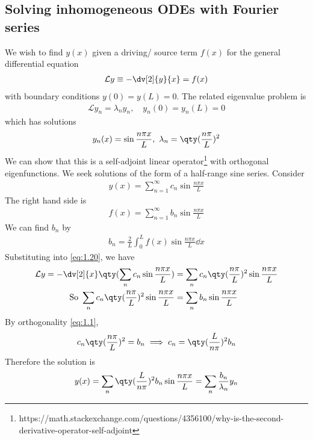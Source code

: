 \subsection{Solving inhomogeneous ODEs with Fourier series} \label{sec:1.6}
We wish to find $y(x)$ given a driving/ source term $f(x)$ for the general differential equation
\begin{align} \label{eq:1.20}
    \mathcal L y \equiv -\dv[2]{y}{x} = f(x)
\end{align}
with boundary conditions $y(0) = y(L) = 0$.
The related eigenvalue problem is
\begin{align*}
    \mathcal L y_n = \lambda_n y_n,\quad y_n(0) = y_n(L) = 0
\end{align*}
which has solutions
\begin{align} \label{eq:1.21}
    y_n(x) = \sin \frac{n \pi x}{L},\ \lambda_n = \qty(\frac{n\pi}{L})^2
\end{align}
We can show that this is a self-adjoint linear operator\footnote{https://math.stackexchange.com/questions/4356100/why-is-the-second-derivative-operator-self-adjoint} with orthogonal eigenfunctions.
We seek solutions of the form of a half-range sine series.
Consider
\begin{align*}
    y(x) = \sum_{n=1}^\infty c_n \sin\frac{n \pi x}{L}
\end{align*}
The right hand side is
\begin{align*}
    f(x) = \sum_{n=1}^\infty b_n \sin \frac{n \pi x}{L}
\end{align*}
We can find $b_n$ by
\begin{align*}
    b_n = \frac{2}{L} \int_0^L f(x) \sin \frac{n \pi x}{L} \dd{x}
\end{align*}
Substituting into \cref{eq:1.20}, we have
\begin{align*}
    \mathcal L y = -\dv[2]{x} \qty(\sum_n c_n \sin \frac{n \pi x}{L}) &= \sum_n c_n \qty(\frac{n\pi}{L})^2 \sin \frac{n \pi x}{L} \\
    \text{So } \sum_n c_n \qty(\frac{n\pi}{L})^2 \sin \frac{n \pi x}{L} &= \sum_n b_n \sin \frac{n \pi x}{L}
\end{align*}
By orthogonality \cref{eq:1.1},
\begin{align*}
    c_n \qty(\frac{n \pi}{L})^2 = b_n \implies c_n = \qty(\frac{L}{n \pi})^2 b_n
\end{align*}
Therefore the solution is
\begin{align} \label{eq:1.22}
    y(x) = \sum_n \qty(\frac{L}{n \pi})^2 b_n \sin \frac{n \pi x}{L} = \sum_n \frac{b_n}{\lambda_n} y_n
\end{align}
